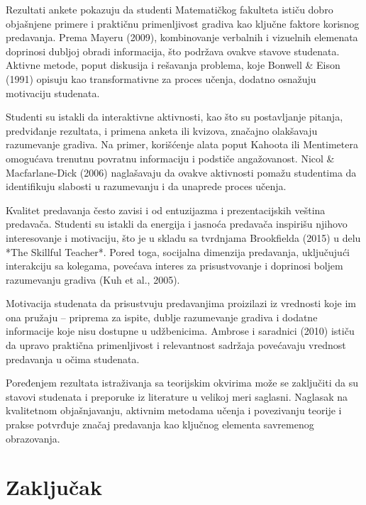\documentclass{article}
\begin{document}
Rezultati ankete pokazuju da studenti Matematičkog fakulteta ističu dobro objašnjene primere i praktičnu primenljivost gradiva kao ključne faktore korisnog predavanja. Prema Mayeru (2009), kombinovanje verbalnih i vizuelnih elemenata doprinosi dubljoj obradi informacija, što podržava ovakve stavove studenata. Aktivne metode, poput diskusija i rešavanja problema, koje Bonwell \& Eison (1991) opisuju kao transformativne za proces učenja, dodatno osnažuju motivaciju studenata.

Studenti su istakli da interaktivne aktivnosti, kao što su postavljanje pitanja, predviđanje rezultata, i primena anketa ili kvizova, značajno olakšavaju razumevanje gradiva. Na primer, korišćenje alata poput Kahoota ili Mentimetera omogućava trenutnu povratnu informaciju i podstiče angažovanost. Nicol \& Macfarlane-Dick (2006) naglašavaju da ovakve aktivnosti pomažu studentima da identifikuju slabosti u razumevanju i da unaprede proces učenja.

Kvalitet predavanja često zavisi i od entuzijazma i prezentacijskih veština predavača. Studenti su istakli da energija i jasnoća predavača inspirišu njihovo interesovanje i motivaciju, što je u skladu sa tvrdnjama Brookfielda (2015) u delu *The Skillful Teacher*. Pored toga, socijalna dimenzija predavanja, uključujući interakciju sa kolegama, povećava interes za prisustvovanje i doprinosi boljem razumevanju gradiva (Kuh et al., 2005).

Motivacija studenata da prisustvuju predavanjima proizilazi iz vrednosti koje im ona pružaju – priprema za ispite, dublje razumevanje gradiva i dodatne informacije koje nisu dostupne u udžbenicima. Ambrose i saradnici (2010) ističu da upravo praktična primenljivost i relevantnost sadržaja povećavaju vrednost predavanja u očima studenata.

Poređenjem rezultata istraživanja sa teorijskim okvirima može se zaključiti da su stavovi studenata i preporuke iz literature u velikoj meri saglasni. Naglasak na kvalitetnom objašnjavanju, aktivnim metodama učenja i povezivanju teorije i prakse potvrđuje značaj predavanja kao ključnog elementa savremenog obrazovanja.


\section{Zaključak}
\end{document}
